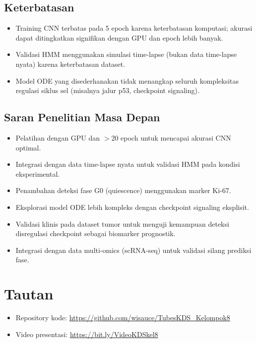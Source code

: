\documentclass[conference]{IEEEtran}
\begin{document}
\subsection{Keterbatasan}
\begin{itemize}[noitemsep,topsep=3pt]
    \item Training CNN terbatas pada 5 epoch karena keterbatasan komputasi; akurasi dapat ditingkatkan signifikan dengan GPU dan epoch lebih banyak.
    \item Validasi HMM menggunakan simulasi time-lapse (bukan data time-lapse nyata) karena keterbatasan dataset.
    \item Model ODE yang disederhanakan tidak menangkap seluruh kompleksitas regulasi siklus sel (misalnya jalur p53, checkpoint signaling).
\end{itemize}

\subsection{Saran Penelitian Masa Depan}
\begin{itemize}[noitemsep,topsep=3pt]
    \item Pelatihan dengan GPU dan $>$20 epoch untuk mencapai akurasi CNN optimal.
    \item Integrasi dengan data time-lapse nyata untuk validasi HMM pada kondisi eksperimental.
    \item Penambahan deteksi fase G0 (quiescence) menggunakan marker Ki-67.
    \item Eksplorasi model ODE lebih kompleks dengan checkpoint signaling eksplisit.
    \item Validasi klinis pada dataset tumor untuk menguji kemampuan deteksi disregulasi checkpoint sebagai biomarker prognostik.
    \item Integrasi dengan data multi-omics (scRNA-seq) untuk validasi silang prediksi fase.
\end{itemize}

\section*{Tautan}
\begin{itemize}[noitemsep,topsep=3pt]
    \item Repository kode: \url{https://github.com/wisauce/TubesKDS_Kelompok8}
    \item Video presentasi: \url{https://bit.ly/VideoKDSkel8}
\end{itemize}
\end{document}
